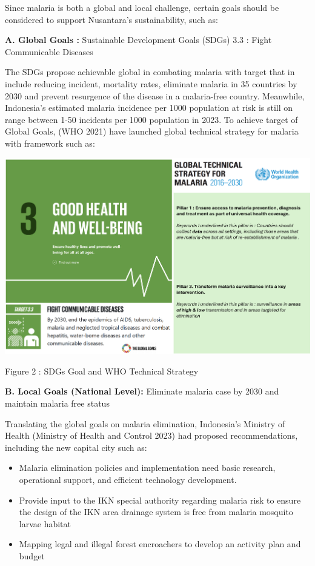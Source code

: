 \documentclass[
  letterpaper,
  DIV=11,
  numbers=noendperiod]{scrreprt}
\begin{document}
Since malaria is both a global and local challenge, certain goals should
be considered to support Nusantara's sustainability, such as:

\textbf{A. Global Goals :} Sustainable Development Goals (SDGs) 3.3 :
Fight Communicable Diseases

The SDGs propose achievable global in combating malaria with target that
in include reducing incident, mortality rates, eliminate malaria in 35
countries by 2030 and prevent resurgence of the disease in a
malaria-free country. Meanwhile, Indonesia's estimated malaria incidence
per 1000 population at risk is still on range between 1-50 incidents per
1000 population in 2023. To achieve target of Global Goals, (WHO 2021)
have launched global technical strategy for malaria with framework such
as:

\includegraphics[width=7.76042in,height=\textheight]{images/clipboard-2410472720.png}

Figure 2 : SDGs Goal and WHO Technical Strategy

\textbf{B. Local Goals (National Level):} Eliminate malaria case by 2030
and maintain malaria free status

Translating the global goals on malaria elimination, Indonesia's
Ministry of Health (Ministry of Health and Control 2023) had proposed
recommendations, including the new capital city such as:

\begin{itemize}
\item
  Malaria elimination policies and implementation need basic research,
  operational support, and efficient technology development.
\item
  Provide input to the IKN special authority regarding malaria risk to
  ensure the design of the IKN area drainage system is free from malaria
  mosquito larvae habitat
\item
  Mapping legal and illegal forest encroachers to develop an activity
  plan and budget
\end{itemize}
\end{document}

